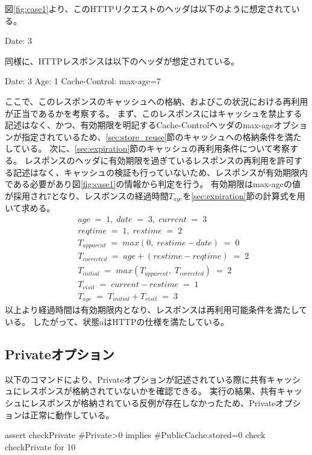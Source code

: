\documentclass{css}
\begin{document}
図\ref{fig:case1}より、このHTTPリクエストのヘッダは以下のように想定されている。
\begin{verbatimtab}[4]
	Date: 3
\end{verbatimtab}
同様に、HTTPレスポンスは以下のヘッダが想定されている。
\begin{verbatimtab}[4]
	Date: 3
	Age: 1
	Cache-Control: max-age=7
\end{verbatimtab}
ここで、このレスポンスのキャッシュへの格納、およびこの状況における再利用が正当であるかを考察する。
まず、このレスポンスにはキャッシュを禁止する記述はなく、かつ、有効期限を明記するCache-Controlヘッダのmax-ageオプションが指定されているため、\ref{sec:store_reuse}節のキャッシュへの格納条件を満たしている。
次に、\ref{sec:expiration}節のキャッシュの再利用条件について考察する。
レスポンスのヘッダに有効期限を過ぎているレスポンスの再利用を許可する記述はなく、キャッシュの検証も行っていないため、レスポンスが有効期限内である必要があり図\ref{fig:case1}の情報から判定を行う。
有効期限はmax-ageの値が採用され7となり、レスポンスの経過時間$T_{age}$を\ref{sec:expiration}節の計算式を用いて求める。
\begin{eqnarray*}
&&age\;=\;1,\; date\;=\;3,\; current\;=\;3\\
&&reqtime\;=\;1,\; restime\;=\;2\\
&&T_{apparent}\;=\;max(0,\;restime - date)\;=\;0\\
&&T_{corrected}\;=\;age + (restime - reqtime)\;=\;2\\
&&T_{initial}\;=\;max(T_{apparent},\;T_{corrected})\;=\;2\\
&&T_{visit}\;=\;current - restime\;=\;1\\
&&T_{age}\;=\;T_{initial} + T_{visit}\;=\;3
\end{eqnarray*}
以上より経過時間は有効期限内となり、レスポンスは再利用可能条件を満たしている。
したがって、状態aはHTTPの仕様を満たしている。

\color{red}
\subsection{Privateオプション}
以下のコマンドにより、Privateオプションが記述されている際に共有キャッシュにレスポンスが格納されていないかを確認できる。
実行の結果、共有キャッシュにレスポンスが格納されている反例が存在しなかったため、Privateオプションは正常に動作している。\\\hrulefill
\begin{small}
\begin{verbatimtab}[2]
assert checkPrivate{
	#Private>0 implies #PublicCache.stored=0
}
check checkPrivate for 10
\end{verbatimtab}
\end{small}
\hrulefill
\end{document}
